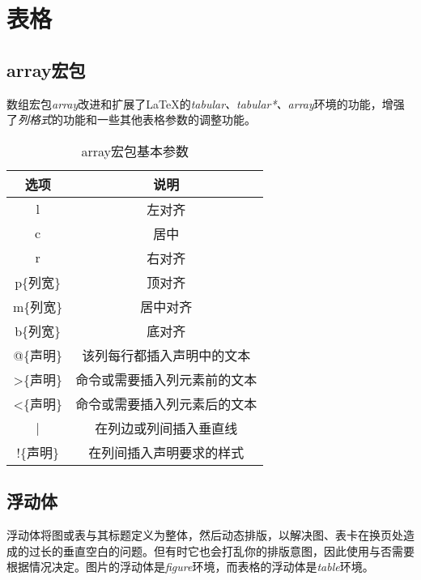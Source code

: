 {\let\clearpage\relax \chapter{表格}}

\section{array宏包}

数组宏包\emph{array}改进和扩展了\LaTeX 的\emph{tabular、tabular*、array}环境的功能，增强了\emph{列格式}的功能和一些其他表格参数的调整功能。

\begin{table}[!ht]
    \caption{array宏包基本参数}
    \begin{center}
    \begin{tabular}{|c|c|}
    \hline 
    选项    &    说明 \\ 
    \hline
    l    &    左对齐 \\ 
    \hline
    c    &    居中 \\ 
    \hline
    r    &    右对齐 \\ 
    \hline
    p\{列宽\}    &    顶对齐 \\ 
    \hline
    m\{列宽\}    &    居中对齐 \\ 
    \hline
    b\{列宽\}    &    底对齐 \\ 
    \hline
    @\{声明\}    &    该列每行都插入声明中的文本 \\ 
    \hline
    >\{声明\}    &    命令或需要插入列元素前的文本 \\ 
    \hline
    <\{声明\}    &    命令或需要插入列元素后的文本 \\ 
    \hline
    |    &    在列边或列间插入垂直线 \\ 
    \hline
    !\{声明\}    &    在列间插入声明要求的样式 \\ 
    \hline
    \end{tabular}
\end{center}
\end{table}

\section{浮动体}

浮动体将图或表与其标题定义为整体，然后动态排版，以解决图、表卡在换页处造成的过长的垂直空白的问题。但有时它也会打乱你的排版意图，因此使用与否需要根据情况决定。图片的浮动体是\emph{figure}环境，而表格的浮动体是\emph{table}环境。

